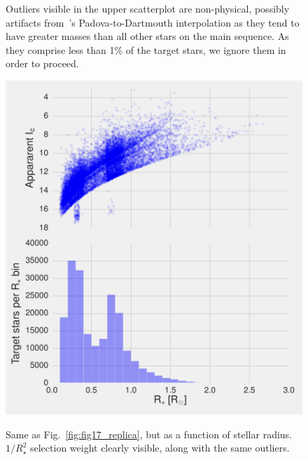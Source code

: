 \begin{figure}[!tb]
{		Outliers visible in the upper scatterplot are non-physical,
		possibly artifacts from~'s
		Padova-to-Dartmouth interpolation as they tend to have greater
		masses than all other stars on the main sequence. 
		As they comprise less than 1\% of the target stars, we ignore them
		in order to proceed.
	}
\end{figure}
\begin{figure}[!tb]
	\includegraphics{figures/fig17_radius_on_x.pdf}
	\label{fig:fig17_radius_on_x}
	\caption{Same as Fig.~\protect\ref{fig:fig17_replica}, but as a function of stellar radius. $1/R_\star^2$ selection weight clearly visible, along with the same outliers.
	}
\end{figure}


